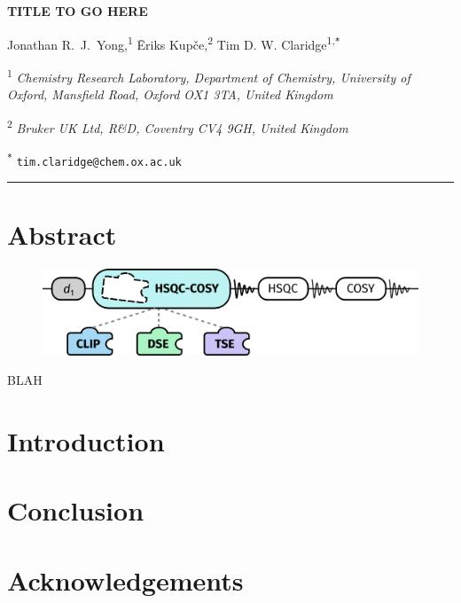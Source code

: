 \documentclass[a4paper,12pt]{article}
\newcommand{\me}{Jonathan R.\ J.\ Yong}
\newcommand{\eriks}{{\=E}riks Kup{\v{c}}e}
\newcommand{\tim}{Tim D. W. Claridge}
\newcommand{\articletitle}{TITLE TO GO HERE}
\newcommand{\crl}{Chemistry Research Laboratory, Department of Chemistry, University of Oxford, Mansfield Road, Oxford OX1 3TA, United Kingdom}
\newcommand{\turing}{The Alan Turing Institute, The British Library, 96 Euston Road, London NW1 2DB, United Kingdom}
\newcommand{\brukeruk}{Bruker UK Ltd, R\&D, Coventry CV4 9GH, United Kingdom}
\newcommand{\exscientia}{Exscientia Ltd, The Schr{\"o}dinger Building, Oxford Science Park, Oxford OX4 4GE, United Kingdom}
\begin{document}
 \begin{refsection}

\begin{center}   %
    \textbf{\Large \articletitle{}}

    \vspace{0.2cm}

    \me{},\textsuperscript{1} \eriks{},\textsuperscript{2} \tim\textsuperscript{1,\texttt{*}}

    \vspace{0.2cm}

    \small

    \textsuperscript{1} \textit{\crl{}}


    \textsuperscript{2} \textit{\brukeruk{}}


    \normalsize \textsuperscript{\texttt{*}} \texttt{tim.claridge@chem.ox.ac.uk}

    \vspace{0.5cm} \hrule

\end{center}

\section*{Abstract}
\begin{figure}[ht]
    \centering\includegraphics{toc.png}%
\end{figure}

BLAH

\section{Introduction}

\section{Conclusion}


\section*{Acknowledgements}


\end{refsection}
\end{document}
